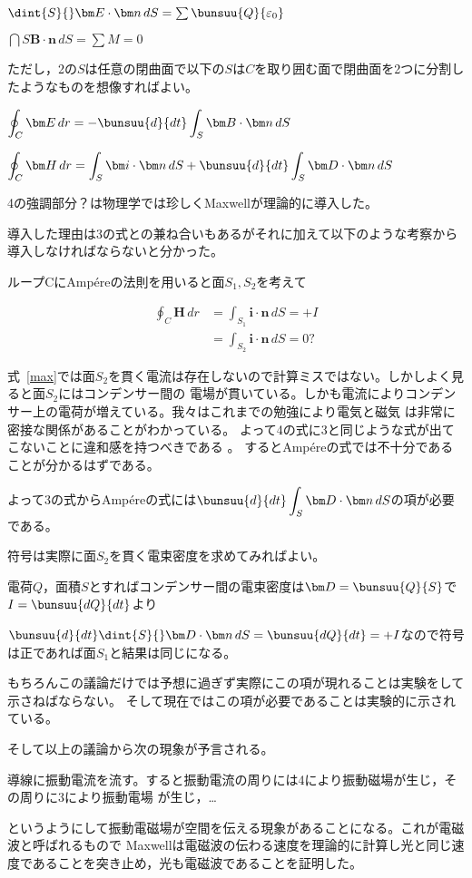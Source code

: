 \begin{Enumerate}
\item $\dint{S}{}\bm E \cdot \bm n\,dS=\sum\bunsuu{Q}{\epsilon_0}$
\item $\dint{S}{}\bm B \cdot \bm n\,dS=\sum M=0$
\end{Enumerate}
ただし，\ajMaru 2の$S$は任意の閉曲面で以下の$S$は$C$を取り囲む面で閉曲面を2つに分割したようなものを想像すればよい。
\begin{Enumerate*}
\item $\displaystyle\oint_C\bm E \,dr=-\bunsuu{d}{dt}\int_S\bm B\cdot \bm n\,dS$
\item $\displaystyle\oint_C\bm H \,dr=\int_S \bm i\cdot \bm n\,dS+\bunsuu{d}{dt}\int_S\bm D\cdot \bm n\,dS$%
\end{Enumerate*}
\ajMaru 4の強調部分？は物理学では珍しくMaxwellが理論的に導入した。

導入した理由は\ajMaru 3の式との兼ね合いもあるがそれに加えて以下のような考察から導入しなければならないと分かった。

ループCにAmp\'ereの法則を用いると面$S_1,S_2$を考えて

\begin{align}
\oint_C\bm H \,dr&=\int_{S_1} \bm i\cdot \bm n\,dS=+I\label{amp}\\
{}&=\int_{S_2} \bm i\cdot \bm n\,dS=0?\label{max}
\end{align}

式~\eqref{max}では面$S_2$を貫く電流は存在しないので計算ミスではない。しかしよく見ると面$S_2$にはコンデンサー間の
電場が貫いている。しかも電流によりコンデンサー上の電荷が増えている。我々はこれまでの勉強により電気と磁気
は非常に密接な関係があることがわかっている。
よって\ajMaru 4の式に\ajMaru 3と同じような式が出てこないことに違和感を持つべきである%
。
するとAmp\'ereの式では不十分であることが分かるはずである。

よって\ajMaru 3の式からAmp\'ereの式には$\displaystyle\bunsuu{d}{dt}\int_S\bm D\cdot \bm n\,dS$の項が必要である。

符号は実際に面$S_2$を貫く電束密度を求めてみればよい。

電荷$Q$，面積$S$とすればコンデンサー間の電束密度は$\bm D=\bunsuu{Q}{S}$で$I=\bunsuu{dQ}{dt}$より

$\bunsuu{d}{dt}\dint{S}{}\bm D\cdot \bm n\,dS=\bunsuu{dQ}{dt}=+I$なので符号は正であれば面$S_1$と結果は同じになる。

もちろんこの議論だけでは予想に過ぎず実際にこの項が現れることは実験をして示さねばならない。
そして現在ではこの項が必要であることは実験的に示されている。

そして以上の議論から次の現象が予言される。

導線に振動電流を流す。すると振動電流の周りには\ajMaru 4により振動磁場が生じ，その周りに\ajMaru 3により振動電場
が生じ，…

というようにして振動電磁場が空間を伝える現象があることになる。これが電磁波と呼ばれるもので
Maxwellは電磁波の伝わる速度を理論的に計算し光と同じ速度であることを突き止め，光も電磁波であることを証明した。

